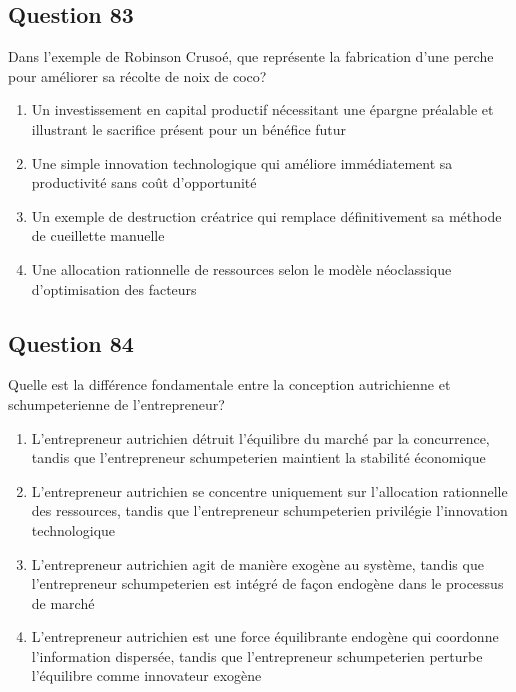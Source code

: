 \documentclass[12pt,a4paper]{article}
\begin{document}
\bigskip


\subsection*{Question 83}
Dans l'exemple de Robinson Crusoé, que représente la fabrication d'une perche pour améliorer sa récolte de noix de coco?

\begin{enumerate}[label=\Alph*., leftmargin=*]
\item Un investissement en capital productif nécessitant une épargne préalable et illustrant le sacrifice présent pour un bénéfice futur
\item Une simple innovation technologique qui améliore immédiatement sa productivité sans coût d'opportunité
\item Un exemple de destruction créatrice qui remplace définitivement sa méthode de cueillette manuelle
\item Une allocation rationnelle de ressources selon le modèle néoclassique d'optimisation des facteurs
\end{enumerate}

\bigskip


\subsection*{Question 84}
Quelle est la différence fondamentale entre la conception autrichienne et schumpeterienne de l'entrepreneur?

\begin{enumerate}[label=\Alph*., leftmargin=*]
\item L'entrepreneur autrichien détruit l'équilibre du marché par la concurrence, tandis que l'entrepreneur schumpeterien maintient la stabilité économique
\item L'entrepreneur autrichien se concentre uniquement sur l'allocation rationnelle des ressources, tandis que l'entrepreneur schumpeterien privilégie l'innovation technologique
\item L'entrepreneur autrichien agit de manière exogène au système, tandis que l'entrepreneur schumpeterien est intégré de façon endogène dans le processus de marché
\item L'entrepreneur autrichien est une force équilibrante endogène qui coordonne l'information dispersée, tandis que l'entrepreneur schumpeterien perturbe l'équilibre comme innovateur exogène
\end{enumerate}
\end{document}
